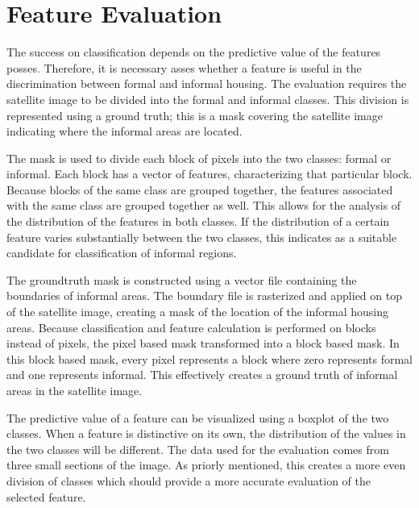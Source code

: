
\section{Feature Evaluation}

The success on classification depends on the predictive value of the features
posses. Therefore, it is necessary asses whether a feature is useful in the
discrimination between formal and informal housing. The evaluation requires the
satellite image to be divided into the formal and informal classes. This division
is represented using a ground truth; this is a mask covering the satellite image
indicating where the informal areas are located.

The mask is used to divide each block of pixels into the two classes: formal or
informal. Each block has a vector of features, characterizing that particular
block. Because blocks of the same class are grouped together, the features
associated with the same class are grouped together as well. This allows for
the analysis of the distribution of the features in both classes. If the
distribution of a certain feature varies substantially between the two classes,
this indicates as a suitable candidate for classification of informal regions.

The groundtruth mask is constructed using a vector file containing the
boundaries of informal areas. The boundary file is rasterized and applied on
top of the satellite image, creating a mask of the location of the informal
housing areas.  Because classification and feature calculation is performed on
blocks instead of pixels, the pixel based mask transformed into a block based
mask. In this block based mask, every pixel represents a block where zero
represents formal and one represents informal. This effectively creates
a ground truth of informal areas in the satellite image.  

The predictive value of a feature can be visualized using a boxplot of the two
classes. When a feature is distinctive on its own, the distribution of the
values in the two classes will be different. The data used for the evaluation
comes from three small sections of the image. As priorly mentioned, this
creates a more even division of classes which should provide a more accurate
evaluation of the selected feature.

